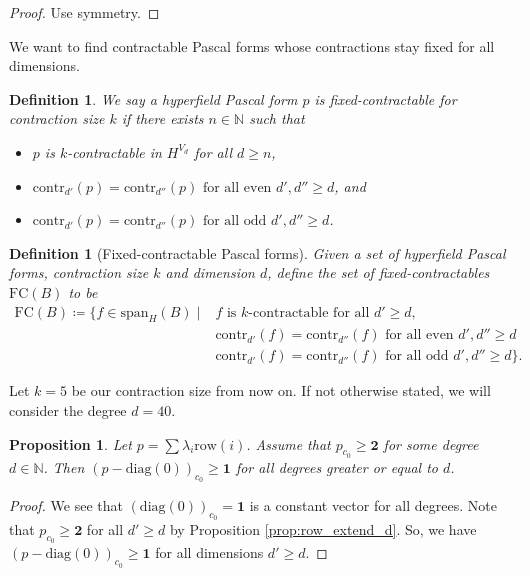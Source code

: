\documentclass[11pt]{article}
\newtheorem{proposition}[theorem]{Proposition}
\newtheorem{definition}[theorem]{Definition}
\begin{document}
\begin{proof}
  Use symmetry.
\end{proof}

We want to find contractable Pascal forms whose contractions stay fixed for all dimensions.

\begin{definition}
  We say a hyperfield Pascal form $p$ is fixed-contractable for contraction size \( k \) if there exists $n \in \mathbb{N}$ such that
  \begin{itemize}
    \item $p$ is $k$-contractable in $H^{V_{d}}$ for all $d \geq n$,
    \item \( \mathrm{contr}_{d'}(p) = \mathrm{contr}_{d''}(p) \text{ for all even } d', d'' \geq d \), and 
    \item \( \mathrm{contr}_{d'}(p) = \mathrm{contr}_{d''}(p) \text{ for all odd } d', d'' \geq d \).
  \end{itemize}
  
\end{definition}

\begin{definition}[Fixed-contractable Pascal forms]
  Given a set of hyperfield Pascal forms, contraction size $k$ and dimension $d$, define the set of fixed-contractables $\mathrm{FC}(B)$ to be 
  \begin{align*}
  \mathrm{FC}(B) \coloneqq \{
      f \in \mathrm{span}_{H}(B) \mid &f \text{ is $k$-contractable for all $d' \geq d$}, \\ &\mathrm{contr}_{d'}(f) = \mathrm{contr}_{d''}(f) \text{ for all even } d', d'' \geq d  \\
   &\mathrm{contr}_{d'}(f) = \mathrm{contr}_{d''}(f) \text{ for all odd } d', d'' \geq d   
 \}.
  \end{align*}
\end{definition}

Let \( k = 5 \) be our contraction size from now on. If not otherwise stated, we will consider the degree \( d = 40 \).

\begin{proposition}\label{prop:row_homo_diag}
  Let \( p = \sum \lambda_i \mathrm{row}(i)\). Assume that \( p_{c_0} \geq \mathbf{2} \) for some degree \( d \in \mathbb{N} \). Then \( (p - \mathrm{diag}(0))_{c_0} \geq \mathbf 1 \) for all degrees greater or equal to \( d \).
\end{proposition}

\begin{proof}
  We see that \( (\mathrm{diag}(0))_{c_0} = \mathbf 1 \) is a constant vector for all degrees. Note that \( p_{c_0} \geq \mathbf 2 \) for all \( d' \geq d \) by Proposition \ref{prop:row_extend_d}. So, we have \( (p - \mathrm{diag}(0))_{c_0} \geq \mathbf 1 \) for all dimensions \( d' \geq d \).
\end{proof}
\end{document}
